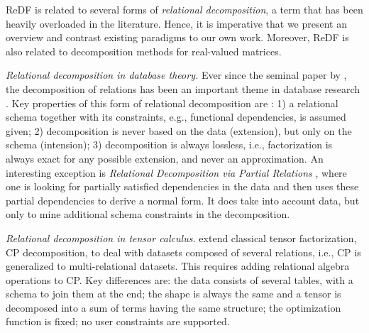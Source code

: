 ReDF is related to several forms of \emph{relational decomposition}, a term that has been heavily overloaded in the literature. Hence, it is imperative that we present an overview and contrast existing paradigms to our own work. Moreover, ReDF is also related to decomposition methods for real-valued matrices.

\textit{Relational decomposition in database theory.} Ever since the seminal paper by \citet{codd}, the decomposition of relations has been an important theme in database research \citep{normal_form_relational_decomposition, date_book}. Key properties of this form of relational decomposition are \citep{elmasri_book}: 1) a relational schema together with its constraints, e.g., functional dependencies, is assumed given; 2) decomposition is never based on the data (extension), but only on the schema (intension); 3) decomposition is always lossless, i.e., factorization is always exact for any possible extension, and never an approximation. An interesting exception is \textit{Relational Decomposition via Partial Relations} \citep{partial_dependencies}, where one is looking for partially satisfied dependencies in the data and then uses these partial dependencies to derive a normal form. It does take into account data, but only to mine additional schema constraints in the decomposition.



\textit{Relational decomposition in tensor calculus.} \citet{tensor_decompositon} extend classical tensor factorization, CP decomposition, to deal with datasets composed of several relations, i.e., CP is generalized to multi-relational datasets. This requires adding relational algebra operations to CP. Key differences are: the data consists of several tables, with a schema to join them at the end; the shape is always the same and a tensor is decomposed into a sum of terms having the same structure; the optimization function is fixed; no user constraints are supported.

